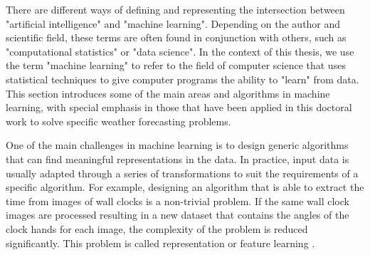 \medskip

There are different ways of defining and representing the intersection between "artificial intelligence" and "machine learning". Depending on the author and scientific field, these terms are often found in conjunction with others, such as "computational statistics" or "data science". In the context of this thesis, we use the term "machine learning" to refer to the field of computer science that uses statistical techniques to give computer programs the ability to "learn" from data. This section introduces some of the main areas and algorithms in machine learning, with special emphasis in those that have been applied in this doctoral work to solve specific weather forecasting problems.

\medskip

One of the main challenges in machine learning is to design generic algorithms that can find meaningful representations in the data. In practice, input data is usually adapted through a series of transformations to suit the requirements of a specific algorithm. For example, designing an algorithm that is able to extract the time from images of wall clocks is a non-trivial problem. If the same wall clock images are processed resulting in a new dataset that contains the angles of the clock hands for each image, the complexity of the problem is reduced significantly. This problem is called representation or feature learning \citep{bengio2013representation}.

\bigskip
\bigskip


\bigskip

\newcommand{\vect}[1]{\boldsymbol{#1}}

